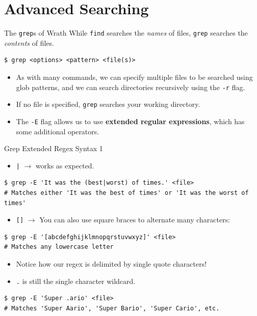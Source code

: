 \documentclass[11pt]{beamer}
\begin{document}
\section[Grep]{Advanced Searching}
\begin{frame}[fragile=singleslide]{The \texttt{grep}s of Wrath}
While \texttt{find} searches the \emph{names} of files, \texttt{grep} searches the \emph{contents} of files. 
\begin{lstlisting}[style=terminal]
$ grep <options> <pattern> <file(s)>
\end{lstlisting}
\begin{itemize}
\item As with many commands, we can specify multiple files to be searched using glob patterns, and we can search directories recursively using the \texttt{-r} flag.
\item If no file is specified, \texttt{grep} searches your working directory.  
\item The \texttt{-E} flag allows us to use \textbf{extended regular expressions}, which has some additional operators. 
\end{itemize}
\end{frame}

\begin{frame}[fragile=singleslide]{Grep Extended Regex Syntax 1} 
\begin{itemize}
\item \texttt{|} $\rightarrow$ works as expected.
\end{itemize}
\begin{lstlisting}[style=terminal]
$ grep -E 'It was the (best|worst) of times.' <file>
# Matches either 'It was the best of times' or 'It was the worst of times'
\end{lstlisting}
\begin{itemize}
\item \texttt{[]} $\rightarrow$ You can also use square braces to alternate many characters:
\end{itemize}

\begin{lstlisting}[style=terminal]
$ grep -E '[abcdefghijklmnopqrstuvwxyz]' <file>
# Matches any lowercase letter
\end{lstlisting}
\begin{itemize}
\item Notice how our regex is delimited by single quote characters! 
\item \texttt{.} is still the single character wildcard.
\end{itemize}
\begin{lstlisting}[style=terminal]
$ grep -E 'Super .ario' <file>
# Matches 'Super Aario', 'Super Bario', 'Super Cario', etc.
\end{lstlisting}
\end{frame}
\end{document}
